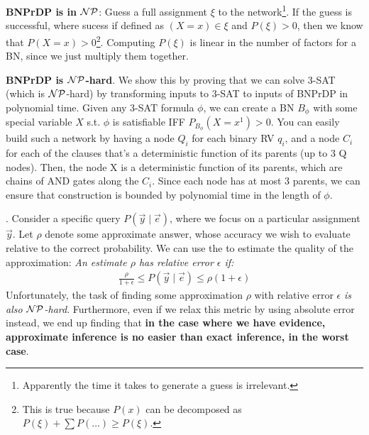\documentclass[11pt]{article}
\begin{document}
\begin{footnotesize}
	\begin{compactenum}
		\item \textbf{BNPrDP is in $\mathcal{N}\mathcal{P}$}: Guess a full assignment $\xi$ to the network\footnote{Apparently the time it takes to generate a guess is irrelevant.}. If the guess is successful, where sucess if defined as $(X=x) \in \xi$ and $P(\xi) > 0$, then we know that $P(X=x) > 0$\footnote{This is true because $P(x)$ can be decomposed as $P(\xi) + \sum P(\ldots) \ge P(\xi)$.}. Computing $P(\xi)$ is linear in the number of factors for a BN, since we just multiply them together.
		
		\item \textbf{BNPrDP is $\mathcal{N}\mathcal{P}$-hard}. We show this by proving that we can solve 3-SAT (which is $\mathcal{N}\mathcal{P}$-hard) by transforming inputs to 3-SAT to inputs of BNPrDP in polynomial time. Given any 3-SAT formula $\phi$, we can create a BN $B_{\phi}$ with some special variable $X$ s.t. $\phi$ is satisfiable IFF $P_{B_{\phi}}(X = x^1) > 0$. You can easily build such a network by having a node $Q_i$ for each binary RV $q_i$, and a node $C_i$ for each of the clauses that's a deterministic function of its parents (up to 3 Q nodes). Then, the node X is a deterministic function of its parents, which are chains of AND gates along the $C_i$. Since each node has at most 3 parents, we can ensure that construction is bounded by polynomial time in the length of $\phi$. 
	\end{compactenum}
\end{footnotesize}

\myspace
\p {}. Consider a specific query $P(\vec y \mid \vec e)$, where we focus on a particular assignment $\vec y$. Let $\rho$ denote some approximate answer, whose accuracy we wish to evaluate relative to the correct probability. We can use the  to estimate the quality of the approximation: \textit{An estimate $\rho$ has relative error $\epsilon$ if:}
\begin{align}
	\frac{\rho}{1 + \epsilon} \le P(\vec y \mid \vec e) \le \rho (1 + \epsilon)
\end{align}
Unfortunately, the task of finding some approximation $\rho$ with relative error $\epsilon$ \textit{is also $\mathcal{N}\mathcal{P}$-hard}. Furthermore, even if we relax this metric by using absolute error instead, we end up finding that \textbf{in the case where we have evidence, approximate inference is no easier than exact inference, in the worst case}.
\end{document}
